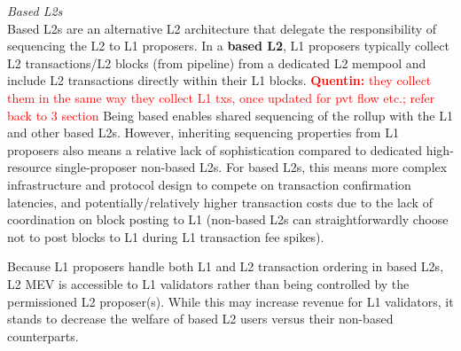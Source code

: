 \documentclass[a4paper]{article}
\theoremstyle{boldstyle}
\newcommand{\cm}[1]{\textcolor{blue}{\textbf{Conor:} #1}}
\newcommand{\qb}[1]{\textcolor{red}{\textbf{Quentin:} #1}}
\newcommand{\lo}[1]{\textcolor{orange}{\textbf{Lin:} #1}}
\begin{document}
    \textit{Based L2s} \\
    Based L2s are an alternative L2 architecture that delegate the responsibility of sequencing the L2 to L1 proposers. 
    In a \textbf{based L2}, L1 proposers typically collect L2 transactions/L2 blocks (from pipeline) from a dedicated L2 mempool and include L2 transactions directly within their L1 blocks. \qb{they collect them in the same way they collect L1 txs, once updated for pvt flow etc.; refer back to 3 section}  
    Being based enables shared sequencing of the rollup with the L1 and other based L2s. 
    However, inheriting sequencing properties from L1 proposers also means a relative lack of sophistication compared to dedicated high-resource single-proposer non-based L2s. For based L2s, this means more complex infrastructure and protocol design to compete on transaction confirmation latencies, and potentially/relatively higher transaction costs due to the lack of coordination on block posting to L1 (non-based L2s can straightforwardly choose not to post blocks to L1 during L1 transaction fee spikes).

    Because L1 proposers handle both L1 and L2 transaction ordering in based L2s, L2 MEV is accessible to L1 validators rather than being controlled by the permissioned L2 proposer(s). While this may increase revenue for L1 validators, it stands to decrease the welfare of based L2 users versus their non-based counterparts. 
    
    

\end{document}
